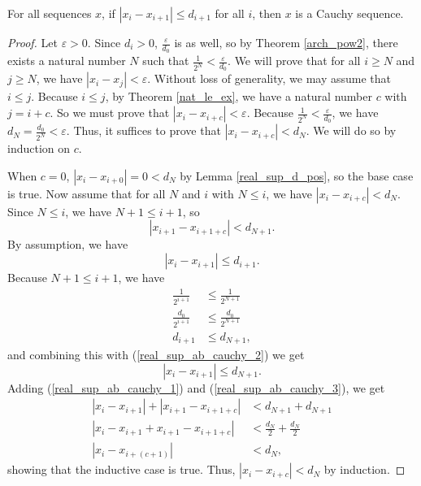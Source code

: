 \documentclass[../../math.tex]{subfiles}
\begin{document}
\begin{lemma} \label{real_sup_ab_cauchy}
    For all sequences $x$, if $|x_i - x_{i+1}| \leq d_{i+1}$ for all $i$, then
    $x$ is a Cauchy sequence.
\end{lemma}
\begin{proof}
    Let $\varepsilon > 0$.  Since $d_i > 0$, $\frac{\varepsilon}{d_0}$ is as
    well, so by Theorem \ref{arch_pow2}, there exists a natural number $N$ such
    that $\frac{1}{2^N} < \frac{\varepsilon}{d_0}$.  We will prove that for all
    $i \geq N$ and $j \geq N$, we have $|x_i - x_j| < \varepsilon$.  Without
    loss of generality, we may assume that $i \leq j$.  Because $i \leq j$, by
    Theorem \ref{nat_le_ex}, we have a natural number $c$ with $j = i + c$.  So
    we must prove that $|x_i - x_{i+c}| < \varepsilon$.  Because $\frac{1}{2^N}
    < \frac{\varepsilon}{d_0}$, we have $d_N = \frac{d_0}{2^N} < \varepsilon$.
    Thus, it suffices to prove that $|x_i - x_{i+c}| < d_N$.  We will do so by
    induction on $c$.

    When $c = 0$, $|x_i - x_{i + 0}| = 0 < d_N$ by Lemma \ref{real_sup_d_pos},
    so the base case is true.  Now assume that for all $N$ and $i$ with $N \leq
    i$, we have $|x_i - x_{i+c}| < d_N$.  Since $N \leq i$, we have $N + 1 \leq
    i + 1$, so
    \begin{equation} \label{real_sup_ab_cauchy_1}
        |x_{i+1} - x_{i+1+c}| < d_{N+1}.
    \end{equation}
    By assumption, we have
    \begin{equation} \label{real_sup_ab_cauchy_2}
        |x_i - x_{i + 1}| \leq d_{i+1}.
    \end{equation}
    Because $N + 1 \leq i + 1$, we have
    \begin{align*}
        \frac{1}{2^{i + 1}} &\leq \frac{1}{2^{N + 1}} \\
        \frac{d_0}{2^{i + 1}} &\leq \frac{d_0}{2^{N + 1}} \\
        d_{i+1} &\leq d_{N+1},
    \end{align*}
    and combining this with (\ref{real_sup_ab_cauchy_2}) we get
    \begin{equation} \label{real_sup_ab_cauchy_3}
        |x_i - x_{i + 1}| \leq d_{N+1}.
    \end{equation}
    Adding (\ref{real_sup_ab_cauchy_1}) and (\ref{real_sup_ab_cauchy_3}), we get
    \begin{align*}
        |x_i - x_{i + 1}| + |x_{i + 1} - x_{i + 1 + c}| &< d_{N+1} + d_{N + 1} \\
        |x_i - x_{i + 1} + x_{i + 1} - x_{i + 1 + c}|
            &< \frac{d_N}{2} + \frac{d_N}{2} \\
        |x_i - x_{i + (c + 1)}| &< d_N,
    \end{align*}
    showing that the inductive case is true.  Thus, $|x_i - x_{i+c}| < d_N$ by
    induction.
\end{proof}
\end{document}
